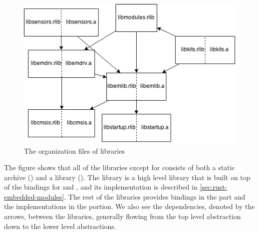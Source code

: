 \begin{figure}[H]
  \begin{center}
    \includegraphics[scale=0.5]{figures/lib-structure.png}
  \end{center}
  \caption{The organization files of libraries}
  \label{fig:lib:structure}
\end{figure}

The figure shows that all of the libraries except for  consists of both a {\C} static archive () and a {\rust} library ().
The  library is a high level library that is built on top of the bindings for {\emlib} and {\emdrv}, and its implementation is described in \autoref{sec:rust-embedded-modules}.
The rest of the libraries provides {\rust} bindings in the  part and the {\C} implementations in the  portion.
We also see the dependencies, denoted by the arrows, between the libraries, generally flowing from the top level abstraction down to the lower level abstractions.
